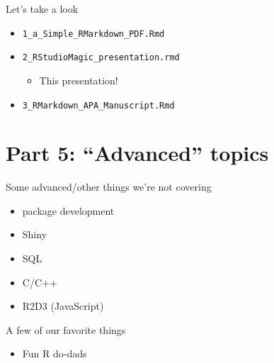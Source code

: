 \documentclass[
  ignorenonframetext,
]{beamer}
\providecommand{\tightlist}{%
  \setlength{\itemsep}{0pt}\setlength{\parskip}{0pt}}
\begin{document}
\begin{frame}[fragile]{Let's take a look}
\protect\hypertarget{lets-take-a-look}{}

\begin{itemize}
\tightlist
\item
  \texttt{1\_a\_Simple\_RMarkdown\_PDF.Rmd}
\item
  \texttt{2\_RStudioMagic\_presentation.rmd}

  \begin{itemize}
  \tightlist
  \item
    This presentation!
  \end{itemize}
\item
  \texttt{3\_RMarkdown\_APA\_Manuscript.Rmd}
\end{itemize}

\end{frame}

\hypertarget{part-5-advanced-topics}{%
\section{Part 5: ``Advanced'' topics}\label{part-5-advanced-topics}}

\begin{frame}{Some advanced/other things we're not covering}
\protect\hypertarget{some-advancedother-things-were-not-covering}{}

\begin{itemize}
\tightlist
\item
  package development
\item
  Shiny
\item
  SQL
\item
  C/C++
\item
  R2D3 (JavaScript)
\end{itemize}

\end{frame}

\begin{frame}{A few of our favorite things}
\protect\hypertarget{a-few-of-our-favorite-things}{}

\begin{itemize}
\tightlist
\item
  Fun R do-dads
\end{itemize}

\end{frame}
\end{document}
